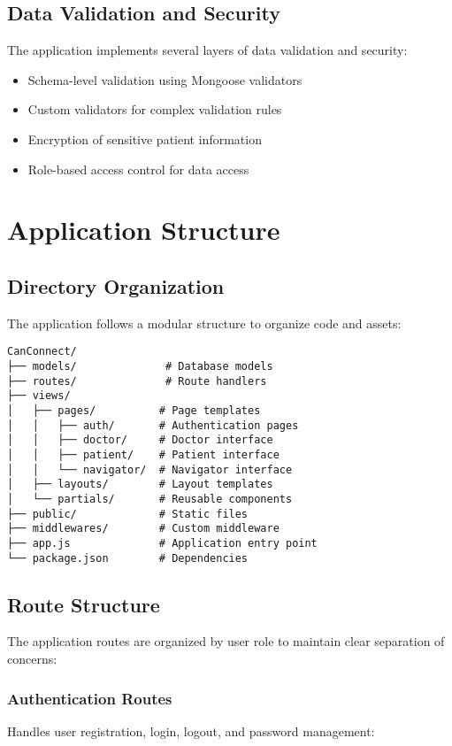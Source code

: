 \documentclass[12pt,a4paper]{report}
\begin{document}
\section{Data Validation and Security}
The application implements several layers of data validation and security:

\begin{itemize}
    \item Schema-level validation using Mongoose validators
    \item Custom validators for complex validation rules
    \item Encryption of sensitive patient information
    \item Role-based access control for data access
\end{itemize}

\chapter{Application Structure}

\section{Directory Organization}
The application follows a modular structure to organize code and assets:

\begin{lstlisting}
CanConnect/
├── models/              # Database models
├── routes/              # Route handlers
├── views/              
│   ├── pages/          # Page templates
│   │   ├── auth/       # Authentication pages
│   │   ├── doctor/     # Doctor interface
│   │   ├── patient/    # Patient interface
│   │   └── navigator/  # Navigator interface
│   ├── layouts/        # Layout templates
│   └── partials/       # Reusable components
├── public/             # Static files
├── middlewares/        # Custom middleware
├── app.js              # Application entry point
└── package.json        # Dependencies
\end{lstlisting}

\section{Route Structure}
The application routes are organized by user role to maintain clear separation of concerns:

\subsection{Authentication Routes}
Handles user registration, login, logout, and password management:
\end{document}
